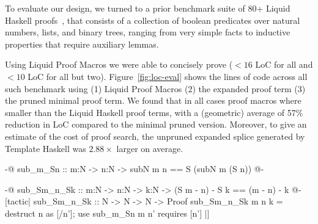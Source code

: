 \smallskip

To evaluate our design, we turned to a prior benchmark suite of 80+
Liquid Haskell proofs~\cite{TacticThesis}, that consists of a
collection of boolean predicates over natural numbers, lists, and
binary trees, ranging from very simple facts to inductive properties
that require auxiliary lemmas.

Using Liquid Proof Macros we were able to concisely prove ($<16$ LoC
for all and $<10$ LoC for all but two). Figure~\ref{fig:loc-eval}
shows the lines of code across all such benchmark using (1) Liquid
Proof Macros (2) the expanded proof term (3) the pruned minimal proof
term. We found that in all cases proof macros where smaller than the
Liquid Haskell proof terms, with a (geometric) average of 57\%
reduction in LoC compared to the minimal pruned version. Moreover, to
give an estimate of the cost of proof search, the unpruned expanded
splice generated by Template Haskell was $2.88\times$ larger on
average.

%  


\begin{code}
  {-@ sub_m_Sn ::  m:N -> n:N -> 
        {subN m n == S (subN m (S n))} @-}

  {-@ sub_Sm_n_Sk :: m:N -> n:N -> k:N -> 
        {(S m - n) - S k == (m - n) - k} @-}
  [tactic|
  sub_Sm_n_Sk :: N -> N -> N -> Proof
  sub_Sm_n_Sk m n k = 
    destruct n as [/n'];
    use {sub_m_Sn m n'} requires [n']
  |]
\end{code}

